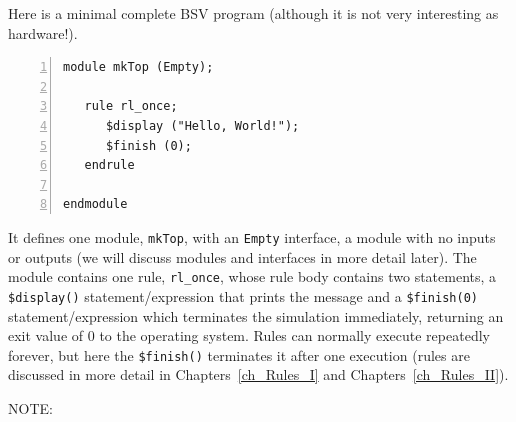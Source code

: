 Here is a minimal complete BSV program (although it is not very
interesting as hardware!).


{\small
\begin{Verbatim}[frame=single, numbers=left, label=in file Exercises/Ex\_03\_A\_Hello\_World/Top.bsv]
module mkTop (Empty);

   rule rl_once;
      $display ("Hello, World!");
      $finish (0);
   endrule
      
endmodule
\end{Verbatim}
}

It defines one module, \verb|mkTop|, with an \verb|Empty| interface,
{\ie} a module with no inputs or outputs (we will discuss modules and
interfaces in more detail later).  The module contains one rule,
\verb|rl_once|, whose rule body contains two statements, a
\verb|$display()| statement/expression that prints the message and a
\verb|$finish(0)| statement/expression which terminates the simulation
immediately, returning an exit value of 0 to the operating system.
Rules can normally execute repeatedly forever, but here the
\verb|$finish()| terminates it after one execution (rules are
discussed in more detail in Chapters~\ref{ch_Rules_I} and
Chapters~\ref{ch_Rules_II}).

\vspace{1ex}

NOTE:

